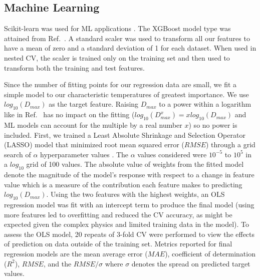 \documentclass[11pt,a4paper]{article}                                %
\begin{document}
\subsection{Machine Learning}\label{sect_ml}

\par
Scikit-learn was used for ML applications \cite{scikit-learn}. The XGBoost model type was attained from Ref.~\cite{xgboost}. A standard scaler was used to transform all our features to have a mean of zero and a standard deviation of 1 for each dataset. When used in nested CV, the scaler is trained only on the training set and then used to transform both the training and test features.

\par
Since the number of fitting points for our regression data are small, we fit a simple model to our characteristic temperatures of greatest importance. We use $log_{10}(D_{max})$ as the target feature. Raising $D_{max}$ to a power within a logarithm like in Ref.~\cite{Johnson2016} has no impact on the fitting ($log_{10}(D_{max}^{x}) = xlog_{10}(D_{max})$ and ML models can account for the multiple by a real number $x$) so no power is included. First, we trained a Least Absolute Shrinkage and Selection Operator (LASSO) model that minimized root mean squared error ($RMSE$) through a grid search of $\alpha$ hyperparameter values \cite{lasso}. The $\alpha$ values considered were $10^{-5}$ to $10^{5}$ in a $log_{10}$ grid of 100 values. The absolute value of weights from the fitted model denote the magnitude of the model's response with respect to a change in feature value which is a measure of the contribution each feature makes to predicting $log_{10}(D_{max})$. Using the two features with the highest weights, an OLS regression model was fit with an intercept term to produce the final model (using more features led to overfitting and reduced the CV accuracy, as might be expected given the complex physics and limited training data in the model). To assess the OLS model, 20 repeats of 3-fold CV were performed to view the effects of prediction on data outside of the training set. Metrics reported for final regression models are the mean average error ($MAE$), coefficient of determination ($R^{2}$), $RMSE$, and the $RMSE/\sigma$ where $\sigma$ denotes the spread on predicted target values.
\end{document}
